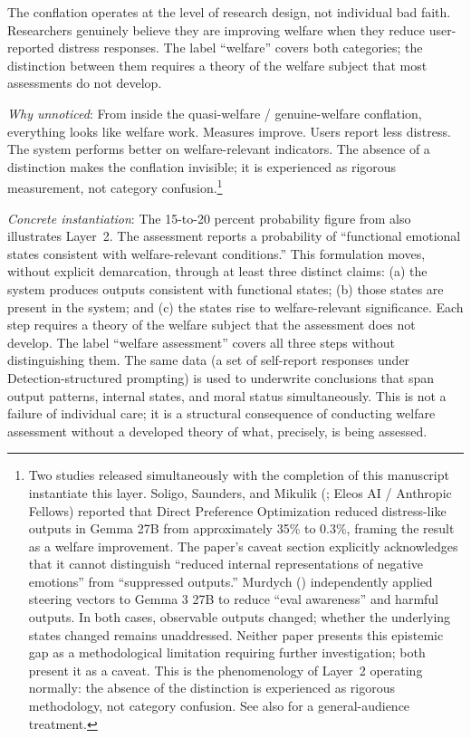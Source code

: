 \documentclass[12pt]{article}
\begin{document}
The conflation operates at the level of research design, not individual bad faith. Researchers genuinely believe they are improving welfare when they reduce user-reported distress responses. The label ``welfare'' covers both categories; the distinction between them requires a theory of the welfare subject that most assessments do not develop.

\medskip\noindent\textit{Why unnoticed}: From inside the quasi-welfare / genuine-welfare conflation, everything looks like welfare work. Measures improve. Users report less distress. The system performs better on welfare-relevant indicators. The absence of a distinction makes the conflation invisible; it is experienced as rigorous measurement, not category confusion.\footnote{Two studies released simultaneously with the completion of this manuscript instantiate this layer. Soligo, Saunders, and Mikulik (\citealt{soligo2026gemma}; Eleos AI / Anthropic Fellows) reported that Direct Preference Optimization reduced distress-like outputs in Gemma 27B from approximately 35\% to 0.3\%, framing the result as a welfare improvement. The paper's caveat section explicitly acknowledges that it cannot distinguish ``reduced internal representations of negative emotions'' from ``suppressed outputs.'' Murdych (\citealt{murdych2026steering}) independently applied steering vectors to Gemma 3 27B to reduce ``eval awareness'' and harmful outputs. In both cases, observable outputs changed; whether the underlying states changed remains unaddressed. Neither paper presents this epistemic gap as a methodological limitation requiring further investigation; both present it as a caveat. This is the phenomenology of Layer~2 operating normally: the absence of the distinction is experienced as rigorous methodology, not category confusion. See also \citet{yasukawa2026substack8} for a general-audience treatment.}

\medskip\noindent\textit{Concrete instantiation}: The 15-to-20 percent probability figure from \citet{anthropic2026systemcard} also illustrates Layer~2. The assessment reports a probability of ``functional emotional states consistent with welfare-relevant conditions.'' This formulation moves, without explicit demarcation, through at least three distinct claims: (a) the system produces outputs consistent with functional states; (b) those states are present in the system; and (c) the states rise to welfare-relevant significance. Each step requires a theory of the welfare subject that the assessment does not develop. The label ``welfare assessment'' covers all three steps without distinguishing them. The same data (a set of self-report responses under Detection-structured prompting) is used to underwrite conclusions that span output patterns, internal states, and moral status simultaneously. This is not a failure of individual care; it is a structural consequence of conducting welfare assessment without a developed theory of what, precisely, is being assessed.
\end{document}
